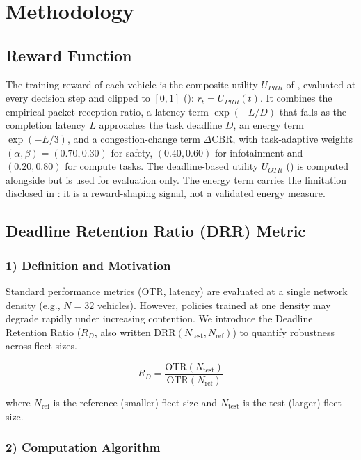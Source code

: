 \documentclass[journal,10pt,twocolumn]{IEEEtran}
\begin{document}
\section{Methodology}
\subsection{Reward Function}

The training reward of each vehicle is the composite utility $U_{PRR}$ of , evaluated at every decision step and clipped to $[0,1]$ (): $r_t = U_{PRR}(t)$. It combines the empirical packet-reception ratio, a latency term $\exp(-L/D)$ that falls as the completion latency $L$ approaches the task deadline $D$, an energy term $\exp(-E/3)$, and a congestion-change term $\Delta\text{CBR}$, with task-adaptive weights $(\alpha,\beta) = (0.70, 0.30)$ for safety, $(0.40, 0.60)$ for infotainment and $(0.20, 0.80)$ for compute tasks. The deadline-based utility $U_{OTR}$ () is computed alongside but is used for evaluation only. The energy term carries the limitation disclosed in : it is a reward-shaping signal, not a validated energy measure.

\subsection{Deadline Retention Ratio (DRR) Metric}

\subsubsection*{1) Definition and Motivation}

Standard performance metrics (OTR, latency) are evaluated at a single network density (e.g., $N = 32$ vehicles). However, policies trained at one density may degrade rapidly under increasing contention. We introduce the Deadline Retention Ratio ($R_D$, also written $\text{DRR}(N_{\text{test}}, N_{\text{ref}})$) to quantify robustness across fleet sizes.

\begin{equation}
\label{eq:drr_definition}
R_D = \frac{\text{OTR}(N_{\text{test}})}{\text{OTR}(N_{\text{ref}})}
\end{equation}

where $N_{\text{ref}}$ is the reference (smaller) fleet size and $N_{\text{test}}$ is the test (larger) fleet size.

\subsubsection*{2) Computation Algorithm}
\end{document}
